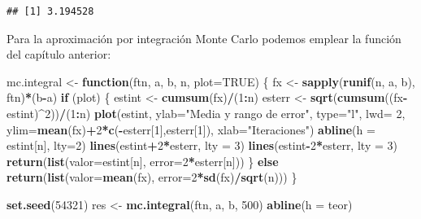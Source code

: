 \documentclass[]{book}
\newenvironment{Shaded}{\begin{snugshade}}{\end{snugshade}}
\newcommand{\KeywordTok}[1]{\textcolor[rgb]{0.13,0.29,0.53}{\textbf{#1}}}
\newcommand{\DataTypeTok}[1]{\textcolor[rgb]{0.13,0.29,0.53}{#1}}
\newcommand{\DecValTok}[1]{\textcolor[rgb]{0.00,0.00,0.81}{#1}}
\newcommand{\StringTok}[1]{\textcolor[rgb]{0.31,0.60,0.02}{#1}}
\newcommand{\OtherTok}[1]{\textcolor[rgb]{0.56,0.35,0.01}{#1}}
\newcommand{\ControlFlowTok}[1]{\textcolor[rgb]{0.13,0.29,0.53}{\textbf{#1}}}
\newcommand{\OperatorTok}[1]{\textcolor[rgb]{0.81,0.36,0.00}{\textbf{#1}}}
\newcommand{\NormalTok}[1]{#1}
\theoremstyle{definition}
\theoremstyle{definition}
\theoremstyle{definition}
\theoremstyle{remark}
\begin{document}
\begin{verbatim}
## [1] 3.194528
\end{verbatim}

Para la aproximación por integración Monte Carlo podemos emplear la
función del capítulo anterior:

\begin{Shaded}
\begin{Highlighting}[]
\NormalTok{mc.integral <-}\StringTok{ }\ControlFlowTok{function}\NormalTok{(ftn, a, b, n, }\DataTypeTok{plot=}\OtherTok{TRUE}\NormalTok{) \{}
\NormalTok{  fx <-}\StringTok{ }\KeywordTok{sapply}\NormalTok{(}\KeywordTok{runif}\NormalTok{(n, a, b), ftn)}\OperatorTok{*}\NormalTok{(b}\OperatorTok{-}\NormalTok{a)}
  \ControlFlowTok{if}\NormalTok{ (plot) \{}
\NormalTok{    estint <-}\StringTok{ }\KeywordTok{cumsum}\NormalTok{(fx)}\OperatorTok{/}\NormalTok{(}\DecValTok{1}\OperatorTok{:}\NormalTok{n)}
\NormalTok{    esterr <-}\StringTok{ }\KeywordTok{sqrt}\NormalTok{(}\KeywordTok{cumsum}\NormalTok{((fx}\OperatorTok{-}\NormalTok{estint)}\OperatorTok{^}\DecValTok{2}\NormalTok{))}\OperatorTok{/}\NormalTok{(}\DecValTok{1}\OperatorTok{:}\NormalTok{n)}
    \KeywordTok{plot}\NormalTok{(estint, }\DataTypeTok{ylab=}\StringTok{"Media y rango de error"}\NormalTok{, }\DataTypeTok{type=}\StringTok{"l"}\NormalTok{, }\DataTypeTok{lwd=} \DecValTok{2}\NormalTok{, }
         \DataTypeTok{ylim=}\KeywordTok{mean}\NormalTok{(fx)}\OperatorTok{+}\DecValTok{2}\OperatorTok{*}\KeywordTok{c}\NormalTok{(}\OperatorTok{-}\NormalTok{esterr[}\DecValTok{1}\NormalTok{],esterr[}\DecValTok{1}\NormalTok{]), }\DataTypeTok{xlab=}\StringTok{"Iteraciones"}\NormalTok{)}
    \KeywordTok{abline}\NormalTok{(}\DataTypeTok{h =}\NormalTok{ estint[n], }\DataTypeTok{lty=}\DecValTok{2}\NormalTok{)}
    \KeywordTok{lines}\NormalTok{(estint}\OperatorTok{+}\DecValTok{2}\OperatorTok{*}\NormalTok{esterr, }\DataTypeTok{lty =} \DecValTok{3}\NormalTok{)}
    \KeywordTok{lines}\NormalTok{(estint}\OperatorTok{-}\DecValTok{2}\OperatorTok{*}\NormalTok{esterr, }\DataTypeTok{lty =} \DecValTok{3}\NormalTok{)}
    \KeywordTok{return}\NormalTok{(}\KeywordTok{list}\NormalTok{(}\DataTypeTok{valor=}\NormalTok{estint[n], }\DataTypeTok{error=}\DecValTok{2}\OperatorTok{*}\NormalTok{esterr[n]))  }
\NormalTok{  \} }\ControlFlowTok{else} \KeywordTok{return}\NormalTok{(}\KeywordTok{list}\NormalTok{(}\DataTypeTok{valor=}\KeywordTok{mean}\NormalTok{(fx), }\DataTypeTok{error=}\DecValTok{2}\OperatorTok{*}\KeywordTok{sd}\NormalTok{(fx)}\OperatorTok{/}\KeywordTok{sqrt}\NormalTok{(n)))}
\NormalTok{\}  }

\KeywordTok{set.seed}\NormalTok{(}\DecValTok{54321}\NormalTok{)}
\NormalTok{res <-}\StringTok{ }\KeywordTok{mc.integral}\NormalTok{(ftn, a, b, }\DecValTok{500}\NormalTok{)}
\KeywordTok{abline}\NormalTok{(}\DataTypeTok{h =}\NormalTok{ teor)}
\end{Highlighting}
\end{Shaded}
\end{document}
